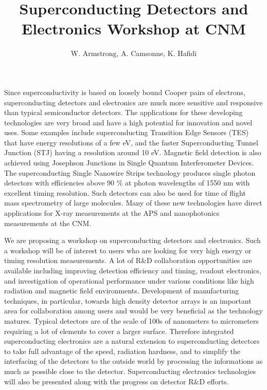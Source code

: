 \documentclass[12pt]{article}
\title{Superconducting Detectors and Electronics Workshop at CNM}
\author{W. Armstrong, A. Camsonne, K. Hafidi}
\begin{document}
\maketitle

Since superconductivity is based on loosely bound Cooper pairs of electrons, 
superconducting detectors and electronics are much more sensitive and 
responsive than typical semiconductor detectors. The applications for these 
developing technologies are very broad and have a high potential for 
innovation and novel uses. Some examples include superconducting Transition Edge 
Sensors (TES) that have energy resolutions of a few eV, and the faster 
Superconducting Tunnel Junction (STJ) having a resolution around 10 eV. 
Magnetic field detection is also achieved using Josephson Junctions in Single 
Quantum Interferometer Devices. The superconducting Single Nanowire Strips 
technology produces single photon detectors with efficiencies above 90 \% at 
photon wavelengths of 1550 nm with excellent timing resolution.  Such detectors 
can also be used for time of flight mass spectrometry of large molecules.  Many 
of these new technologies have direct applications for X-ray measurements at 
the APS and nanophotonics measurements at the CNM.

We are proposing a workshop on superconducting detectors and electronics.
Such a workshop will be of interest to users who are looking for very high 
energy or timing resolution measurements. A lot of R\&D collaboration 
opportunities are available including improving detection efficiency and timing, 
readout electronics, and investigation of operational performance under 
various conditions like high radiation and magnetic field environments.
Development of manufacturing techniques, in particular, towards high density 
detector arrays is an important area for collaboration among users and would 
be very beneficial as the technology matures. Typical detectors are of 
the scale of 100s of nanometers to micrometers requiring a lot of elements to cover 
a larger surface. Therefore integrated superconducting electronics are a natural 
extension to superconducting detectors to take full advantage of the speed, 
radiation hardness, and to simplify the interfacing of the detectors to the outside 
world by processing the informations as much as possible close to the 
detector. Superconducting electronics technologies will also be presented along 
with the progress on detector R\&D efforts.

\vspace{2cm}
\end{document}

